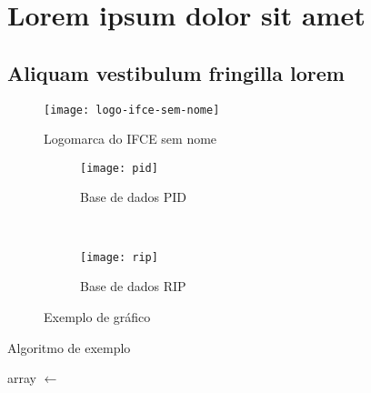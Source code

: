 \chapter{Lorem ipsum dolor sit amet}\label{cap:exampleChapter}
\section{Aliquam vestibulum fringilla lorem}

\lipsum[1]

\begin{figure}[h]\label{fig:logo-ifce-sem-nome}
	\begin{center}
		\texttt{[image: logo-ifce-sem-nome]}
		\caption{Logomarca do IFCE sem nome}
	\end{center}
\end{figure}
\lipsum[2-3]


\lipsum[2-3]
\begin{figure}
    \centering
    \begin{subfigure}[b]{0.45\textwidth}
        \texttt{[image: pid]}
        \caption{Base de dados PID}
        \label{fig:pid}
    \end{subfigure}
    ~ 
    \begin{subfigure}[b]{0.45\textwidth}
        \texttt{[image: rip]}
        \caption{Base de dados RIP}
        \label{fig:rip}
    \end{subfigure}
    \caption{Exemplo de gráfico}\label{fig:animals}
\end{figure}
\lipsum[2]

\begin{algorithm}
\caption{Algoritmo de exemplo}\label{bogosort}
  \begin{algorithmic}[1]
    \State array $\gets$  
    \EndWhile
  \EndProcedure
  \end{algorithmic}
\end{algorithm}

\lipsum[1]
